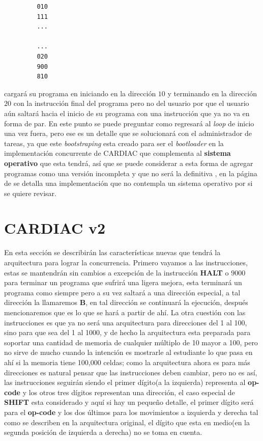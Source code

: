 \documentclass[12pt]{article}
\begin{document}
	 \begin{verbatim}
		 010
		 111
		 ...
		 
		 ...		 
		 020
		 900
		 810
	 \end{verbatim}
	
	cargará su programa en iniciando en la dirección $10$ y terminando en la dirección $20$ con la instrucción final del programa pero
	no del usuario por que el usuario aún saltará hacia el inicio de su programa con una instrucción que ya no va en forma de par. En
	este punto se puede preguntar como regresará al \textit{loop} de inicio una vez fuera, pero ese es un detalle que se solucionará con
	el administrador de tareas, ya que este \textit{bootstraping} esta creado para ser el \textit{bootloader} en la implementación concurrente
	de CARDIAC que complementa al \textbf{sistema operativo} que esta tendrá, así que se puede considerar a esta forma de
	agregar programas como una versión incompleta y que no será la definitiva
	, en la página de \cite{noauthor_cardiac_nodate} se detalla una implementación que no contempla un sistema operativo por si se quiere revisar.
	

	\section{CARDIAC v2}
	
	En esta sección se describirán las características nuevas que tendrá la arquitectura para lograr la concurrencia. Primero vayamos a
	las instrucciones, estas se mantendrán sin cambios a excepción de la instrucción \textbf{HALT} o $9000$ para terminar un programa que
	sufrirá una ligera mejora, esta terminará un programa como siempre pero a su vez saltará a una dirección especial, a tal
	dirección la llamaremos \textbf{B}, en tal dirección se continuará la ejecución, después mencionaremos que es lo que se hará a partir
	de ahí. La otra cuestión con las instrucciones es que ya no será una arquitectura para direcciones del 1 al 100, sino para
	que sea del 1 al 1000, y de hecho la arquitectura esta preparada para soportar una cantidad de memoria de cualquier múltiplo de 10 mayor
	a 100, pero no sirve de mucho cuando la intención es mostrarle al estudiante lo que pasa en ahí si la memoria tiene
	100,000 celdas; como la arquitectura ahora es para más direcciones es natural pensar que las instrucciones deben cambiar, pero no es
	así, las instrucciones seguirán siendo el primer dígito(a la izquierda) representa al \textbf{op-code} y los otros
	tres dígitos representan una dirección, el caso especial de \textbf{SHIFT} esta considerado y aquí si hay un pequeño detalle,
	el primer dígito será para el \textbf{op-code} y los dos últimos para los movimientos a izquierda y derecha tal como
	se describen en la arquitectura original, el dígito que esta en medio(en la segunda posición de izquierda a derecha) no
	se toma en cuenta.
	
\end{document}
